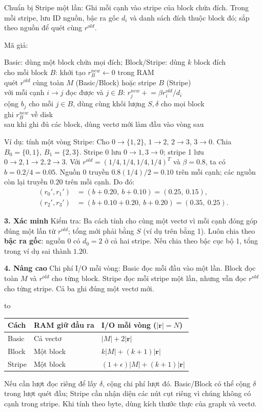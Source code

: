 \documentclass[10pt,a4paper,twocolumn]{article}
\makeatletter
\newcommand{\key}[1]{#1:\enspace}
\newenvironment{examtable}[1]{%
  \par\addvspace{2pt}\noindent\hbox to \linewidth\bgroup\hfil
  \setlength{\tabcolsep}{4pt}%
  \renewcommand{\arraystretch}{1.12}\begin{tabular}{#1}%
}{\end{tabular}\hfil\egroup\par\addvspace{2pt}}
\newcommand{\unitheading}[2]{%
  \par\addvspace{1pt}\noindent\textbf{#1. #2}\enspace}
\newcommand{\unitverification}{\unitheading{3}{Xác minh}}
\newcommand{\unitadvanced}{\unitheading{4}{Nâng cao}}
\newenvironment{algpseudo}{%
  \par\addvspace{2pt}\noindent
  \setlength{\parskip}{0pt}%
  Mã giả:\par\nobreak
  \begin{list}{}{\setlength{\leftmargin}{1em}\setlength{\topsep}{0pt}%
    \setlength{\partopsep}{0pt}\setlength{\parsep}{0pt}%
    \@beginparpenalty=10000\relax}%
  \item\relax
}{\end{list}\par\addvspace{3pt}}
\makeatother
\begin{document}
\key{Chuẩn bị Stripe một lần} Ghi mỗi cạnh vào stripe của block chứa đích. Trong mỗi stripe, lưu ID nguồn, bậc ra gốc $d_i$ và danh sách đích thuộc block đó; sắp theo nguồn để quét cùng $r^{old}$.
\begin{algpseudo}
Basic: dùng một block chứa mọi đích; Block/Stripe: dùng $k$ block đích\\
cho mỗi block $B$: khởi tạo $r_B^{new}\gets0$ trong RAM\\
\quad quét $r^{old}$ cùng toàn $M$ (Basic/Block) hoặc stripe $B$ (Stripe)\\
\quad với mỗi cạnh $i\to j$ đọc được và $j\in B$: $r_j^{new}\mathrel{+}=\beta r_i^{old}/d_i$\\
\quad cộng $b_j$ cho mỗi $j\in B$, dùng cùng khối lượng $S,\delta$ cho mọi block\\
\quad ghi $r_B^{new}$ về disk\\
sau khi ghi đủ các block, dùng vectơ mới làm đầu vào vòng sau
\end{algpseudo}

\key{Ví dụ: tính một vòng Stripe} Cho $0\to\{1,2\}$, $1\to2$, $2\to3$, $3\to0$. Chia $B_0=\{0,1\}$, $B_1=\{2,3\}$. Stripe 0 lưu $0\to1,3\to0$; stripe 1 lưu $0\to2,1\to2,2\to3$. Với $r^{old}=(1/4,1/4,1/4,1/4)^T$ và $\beta=0.8$, ta có $b=0.2/4=0.05$. Nguồn 0 truyền $0.8(1/4)/2=0.10$ trên mỗi cạnh; các nguồn còn lại truyền $0.20$ trên mỗi cạnh. Do đó:
\[
\begin{aligned}
(r_0',r_1')&=(b+0.20,\ b+0.10)=(0.25,\ 0.15),\\
(r_2',r_3')&=(b+0.10+0.20,\ b+0.20)=(0.35,\ 0.25).
\end{aligned}
\]

\unitverification
\key{Kiểm tra} Ba cách tính cho cùng một vectơ vì mỗi cạnh đóng góp đúng một lần từ $r^{old}$; tổng mới phải bằng $S$ (ví dụ trên bằng 1). Luôn chia theo \textbf{bậc ra gốc}: nguồn 0 có $d_0=2$ ở cả hai stripe. Nếu chia theo bậc cục bộ 1, tổng trong ví dụ sai thành $1.20$.

\unitadvanced
\key{Chi phí I/O mỗi vòng} Basic đọc mỗi đầu vào một lần. Block đọc toàn $M$ và $r^{old}$ cho từng block. Stripe đọc mỗi stripe một lần, nhưng vẫn đọc $r^{old}$ cho từng stripe. Cả ba ghi đúng một vectơ mới.
\begin{examtable}{@{}lll@{}}
\toprule
Cách & RAM giữ đầu ra & I/O mỗi vòng ($|\mathbf r|=N$) \\
\midrule
Basic & Cả vectơ & $|M|+2|\mathbf r|$ \\
Block & Một block & $k|M|+(k+1)|\mathbf r|$ \\
Stripe & Một block & $(1+\epsilon)|M|+(k+1)|\mathbf r|$ \\
\bottomrule
\end{examtable}
Nếu cần lượt đọc riêng để lấy $\delta$, cộng chi phí lượt đó. Basic/Block có thể cộng $\delta$ trong lượt quét đầu; Stripe cần nhận diện các nút cụt riêng vì chúng không có cạnh trong stripe. Khi tính theo byte, dùng kích thước thực của graph và vectơ.
\end{document}
